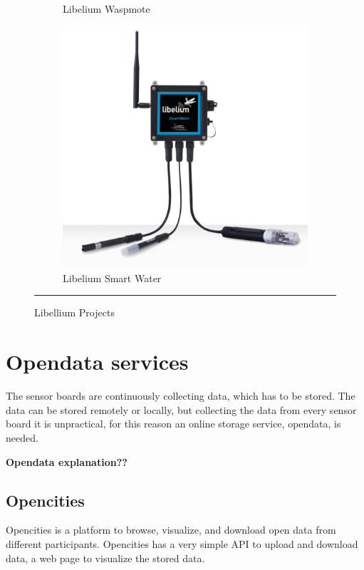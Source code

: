 \documentclass[12pt, a4paper,twoside]{tesi_upf}
\begin{document}
\begin{figure}
\begin{subfigure}[b]{0.3\textwidth}
                \caption{Libelium Waspmote}
                \label{fig:LibeliumWaspmote}
        \end{subfigure}
        \begin{subfigure}[b]{0.3\textwidth}
                \includegraphics[width=\textwidth]{./Figures/LibeliumSmartWater.png}
                \caption{Libelium Smart Water}
                \label{fig:LibeliumSmartWater}
        \end{subfigure}
        \rule{18em}{0.5pt}
        \caption{Libellium Projects}\label{fig:LibelliumProjects}
		\end{figure}

  \section{Opendata services}
    The sensor boards are continuously collecting data, which has to be stored. The data can be stored remotely or locally, but collecting the data from every sensor board it is unpractical, for this reason an online storage service, opendata, is needed.    
    
    {\bf Opendata explanation??}
    
		\subsection{Opencities}
       Opencities \cite{opencities} is a platform to browse, visualize, and download open data from different participants. Opencities has a very simple API to upload and download data, a web page to visualize the stored data.
       
\end{document}
